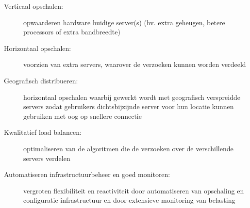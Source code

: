 \begin{description}
    \item [Verticaal opschalen:] opwaarderen hardware huidige server(s)
    (bv. extra geheugen, betere processors of extra bandbreedte)

    \item [Horizontaal opschalen:] voorzien van extra servers,
    waarover de verzoeken kunnen worden verdeeld

    \item [Geografisch distribueren:] horizontaal opschalen
    waarbij gewerkt wordt met geografisch verspreidde servers
    zodat gebruikers dichtsbijzijnde server voor hun locatie kunnen gebruiken
    met oog op snellere connectie

    \item [Kwalitatief load balancen:] optimaliseren van de algoritmen die
    de verzoeken over de verschillende servers verdelen

    \item [Automatiseren infrastructuurbeheer en goed monitoren:] vergroten
    flexibiliteit en reactiviteit door automatiseren van opschaling en
    configuratie infrastructuur en door extensieve monitoring van belasting
    

\end{description}

